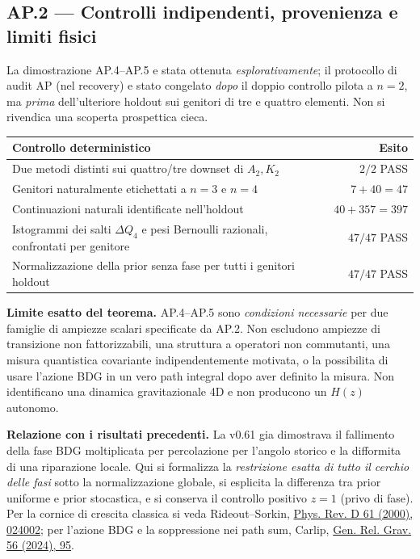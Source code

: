 \documentclass[11pt,a4paper]{article}
\begin{document}
\clearpage
\subsection*{AP.2 --- Controlli indipendenti, provenienza e limiti fisici}
La dimostrazione AP.4--AP.5 e stata ottenuta \emph{esplorativamente}; il protocollo di audit AP (nel recovery) e stato congelato \emph{dopo} il doppio controllo pilota a $n=2$, ma \emph{prima} dell'ulteriore holdout sui genitori di tre e quattro elementi. Non si rivendica una scoperta prospettica cieca.

\begin{center}\small
\begin{tabular}{p{9.2cm}r}
\toprule
Controllo deterministico & Esito\\
\midrule
Due metodi distinti sui quattro/tre downset di $A_2,K_2$ & $2/2$ PASS\\
Genitori naturalmente etichettati a $n=3$ e $n=4$ & $7+40=47$\\
Continuazioni naturali identificate nell'holdout & $40+357=397$\\
Istogrammi dei salti $\Delta Q_4$ e pesi Bernoulli razionali, confrontati per genitore & $47/47$ PASS\\
Normalizzazione della prior senza fase per tutti i genitori holdout & $47/47$ PASS\\
\bottomrule
\end{tabular}
\end{center}
\textbf{Limite esatto del teorema.} AP.4--AP.5 sono \emph{condizioni necessarie} per due famiglie di ampiezze scalari specificate da AP.2. Non escludono ampiezze di transizione non fattorizzabili, una struttura a operatori non commutanti, una misura quantistica covariante indipendentemente motivata, o la possibilita di usare l'azione BDG in un vero path integral dopo aver definito la misura. Non identificano una dinamica gravitazionale 4D e non producono un $H(z)$ autonomo.

\textbf{Relazione con i risultati precedenti.} La v0.61 gia dimostrava il fallimento della fase BDG moltiplicata per percolazione per l'angolo storico e la difformita di una riparazione locale. Qui si formalizza la \emph{restrizione esatta di tutto il cerchio delle fasi} sotto la normalizzazione globale, si esplicita la differenza tra prior uniforme e prior stocastica, e si conserva il controllo positivo $z=1$ (privo di fase). Per la cornice di crescita classica si veda Rideout--Sorkin, \href{https://doi.org/10.1103/PhysRevD.61.024002}{Phys. Rev. D 61 (2000), 024002}; per l'azione BDG e la soppressione nei path sum, Carlip, \href{https://doi.org/10.1007/s10714-024-03281-1}{Gen. Rel. Grav. 56 (2024), 95}.
\end{document}
